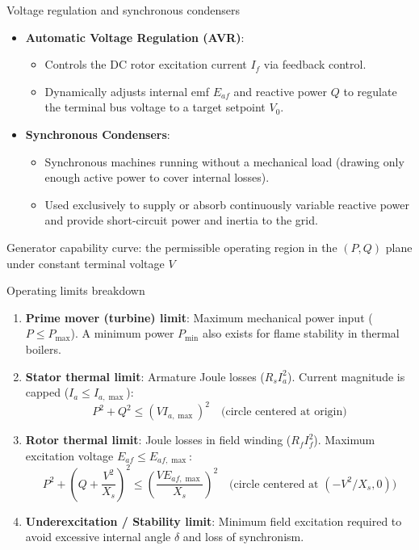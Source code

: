 \begin{frame}{Voltage regulation and synchronous condensers}
  \begin{itemize}
    \item \textbf{Automatic Voltage Regulation (AVR)}:
      \begin{itemize}
        \item Controls the DC rotor excitation current $I_f$ via feedback control.
        \item Dynamically adjusts internal emf $E_{af}$ and reactive power $Q$ to regulate the terminal bus voltage to a target setpoint $V_0$.
      \end{itemize}
    \vspace{0.3cm}
    \item \textbf{Synchronous Condensers}:
      \begin{itemize}
        \item Synchronous machines running without a mechanical load (drawing only enough active power to cover internal losses).
        \item Used exclusively to supply or absorb continuously variable reactive power and provide short-circuit power and inertia to the grid.
      \end{itemize}
  \end{itemize}
\end{frame}

\begin{frame}{Generator capability curve: the permissible operating region in the $(P, Q)$ plane under constant terminal voltage $V$}
   \begin{center}
    
   \end{center}
\end{frame}

\begin{frame}{Operating limits breakdown}
  \small
  \begin{enumerate}\setlength{\itemsep}{0pt}\setlength{\parskip}{0pt}
    \item \textbf{Prime mover (turbine) limit}: Maximum mechanical power input ($P \le P_{\max}$). A minimum power $P_{\min}$ also exists for flame stability in thermal boilers.
    \item \textbf{Stator thermal limit}: Armature Joule losses ($R_s I_a^2$). Current magnitude is capped ($I_a \le I_{a,\max}$):
      $$P^2 + Q^2 \le (V I_{a,\max})^2 \quad \text{(circle centered at origin)}$$
    \item \textbf{Rotor thermal limit}: Joule losses in field winding ($R_f I_f^2$). Maximum excitation voltage $E_{af} \le E_{af,\max}$:
      $$P^2 + \left(Q + \frac{V^2}{X_s}\right)^2 \le \left(\frac{V E_{af,\max}}{X_s}\right)^2 \quad \text{(circle centered at } (-V^2/X_s, 0)\text{)}$$
    \item \textbf{Underexcitation / Stability limit}: Minimum field excitation required to avoid excessive internal angle $\delta$ and loss of synchronism.
  \end{enumerate}
\end{frame}

